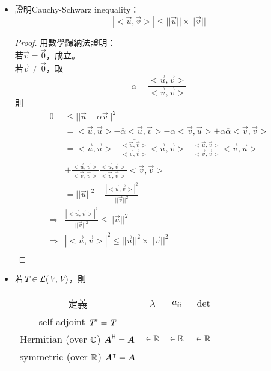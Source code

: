 \begin{itemize}
\begin{itemize}
    \end{itemize}
    \item 證明Cauchy-Schwarz inequality：\begin{equation}
		|<\vec{u}, \vec{v}>| \le ||\vec{u}|| \times ||\vec{v}||
	\end{equation} \begin{proof}
		用數學歸納法證明： \\
		若$\vec{v} = \vec{0}$，成立。 \\
		若$\vec{v} \neq \vec{0}$，取\begin{equation}
			\alpha = \frac{<\vec{u}, \vec{v}>}{<\vec{v}, \vec{v}>}
		\end{equation} 則 \begin{equation}
			\begin{aligned}
				0 & \le ||\vec{u} - \alpha\vec{v}||^2 \\
				& = <\vec{u}, \vec{u}> - \overline{\alpha}<\vec{u}, \vec{v}> - \alpha<\vec{v}, \vec{u}> + \alpha\overline{\alpha}<\vec{v}, \vec{v}> \\
				& = <\vec{u}, \vec{u}> - \overline{\frac{<\vec{u}, \vec{v}>}{<\vec{v}, \vec{v}>}}<\vec{u}, \vec{v}> - \frac{<\vec{u}, \vec{v}>}{<\vec{v}, \vec{v}>}<\vec{v}, \vec{u}> \\
				& + \frac{<\vec{u}, \vec{v}>}{<\vec{v}, \vec{v}>}\overline{\frac{<\vec{u}, \vec{v}>}{<\vec{v}, \vec{v}>}}<\vec{v}, \vec{v}> \\
				& = ||\vec{u}||^2 - \frac{|<\vec{u}, \vec{v}>|^2}{||\vec{v}||^2} \\
				\Rightarrow & \frac{|<\vec{u}, \vec{v}>|^2}{||\vec{v}||^2} \le ||\vec{u}||^2 \\
				\Rightarrow & |<\vec{u}, \vec{v}>|^2 \le ||\vec{u}||^2 \times ||\vec{v}||^2 \\
			\end{aligned}
		\end{equation}
    \end{proof}
    \item 若$\textit{T} \in \mathcal{L}(\textit{V}, \textit{V})$，則
	\begin{table}[H]
		\renewcommand{\arraystretch}{2}
		\begin{tabular}{|c|c|c|c|}
			\hline
			定義 & $\lambda$ & $a_{ii}$ & $\det$ \\
			\Xhline{3\arrayrulewidth}
			self-adjoint $\textit{T}^* = \textit{T}$ & \multirow{3}{*}{$\in \mathbb{R}$} 
			& \multirow{3}{*}{$\in \mathbb{R}$} & \multirow{3}{*}{$\in \mathbb{R}$} \\
			Hermitian (over $\mathbb{C}$) $\boldsymbol{A}^{\mathsf{H}} = \boldsymbol{A}$ & & & \\
			\cline{1-1}
			symmetric (over $\mathbb{R}$) $\boldsymbol{A}^\intercal = \boldsymbol{A}$ & & & \\


\end{tabular}
\end{table}
\end{itemize}
